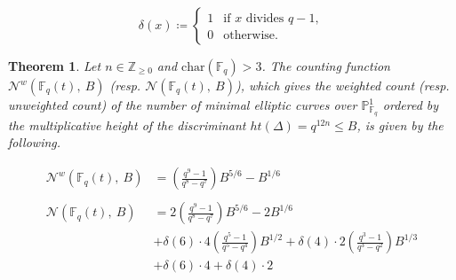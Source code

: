 \documentclass[a4paper,12pt]{amsart}
\newtheorem{thm}{Theorem}[section]
\theoremstyle{definition}
\newcommand{\Nc}{\mathcal{N}}
\newcommand{\Pb}{\mathbb{P}}
\newcommand{\Fb}{\mathbb{F}}
\begin{document}
	\[
	\delta(x)\coloneqq
	\begin{cases}
		1 & \text{if } x \text{ divides } q-1,\\
		0 & \text{otherwise.}
	\end{cases}
	\]
	\begin{thm}\label{thm:ell_curve_min_count_body}
		Let $n \in \mathbb{Z}_{\ge 0}$ and $\text{char} (\Fb_q) > 3$. The counting function $\Nc^w(\Fb_q(t),~B)$ (resp. $\Nc(\Fb_q(t), ~B)$), which gives the weighted count (resp. unweighted count) of the number of minimal elliptic curves over $\Pb^1_{\Fb_q}$ ordered by the multiplicative height of the discriminant $ht(\Delta) = q^{12n} \le B$, is given by the following.   
		
		\begin{align*}
			\Nc^w(\Fb_q(t),~B) &= \left( \frac{q^{9} - 1}{q^{8} - q^{7}} \right) B^{5/6} - B^{1/6} \\\\
			\Nc(\Fb_q(t),~B) &= 2 \left( \frac{q^{9} - 1}{q^{8} - q^{7}} \right) B^{5/6} - 2 B^{1/6}   \\
			& + \delta(6) \cdot 4 \left( \frac{q^{5} - 1}{q^{5} - q^{4}} \right) B^{1/2} +  \delta(4) \cdot 2 \left( \frac{q^{3} - 1}{q^{3} - q^{2}} \right) B^{1/3}  \\
			& + \delta(6) \cdot 4 + \delta(4) \cdot 2 \\
		\end{align*}
		
	\end{thm}
	
\end{document}
